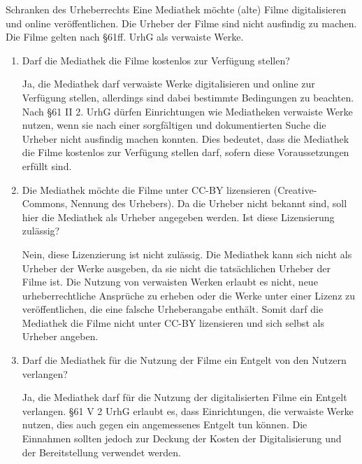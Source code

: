 \documentclass{article}
\begin{document}
\begin{exercise}{Schranken des Urheberrechts}
  Eine Mediathek möchte (alte) Filme digitalisieren und online veröffentlichen. Die Urheber der Filme sind nicht ausfindig zu machen. Die Filme gelten nach §61ff. UrhG als verwaiste Werke.
  \begin{enumerate}
    \item Darf die Mediathek die Filme kostenlos zur Verfügung stellen?

          \begin{solution}
            Ja, die Mediathek darf verwaiste Werke digitalisieren und online zur Verfügung stellen, allerdings sind dabei bestimmte Bedingungen zu beachten. Nach §61 II 2. UrhG dürfen Einrichtungen wie Mediatheken verwaiste Werke nutzen, wenn sie nach einer sorgfältigen und dokumentierten Suche die Urheber nicht ausfindig machen konnten. Dies bedeutet, dass die Mediathek die Filme kostenlos zur Verfügung stellen darf, sofern diese Voraussetzungen erfüllt sind.
          \end{solution}

    \item Die Mediathek möchte die Filme unter CC-BY lizensieren (Creative-Commons, Nennung des Urhebers). Da die Urheber nicht bekannt sind, soll hier die Mediathek als Urheber angegeben werden. Ist diese Lizensierung zulässig?

          \begin{solution}
            Nein, diese Lizenzierung ist nicht zulässig. Die Mediathek kann sich nicht als Urheber der Werke ausgeben, da sie nicht die tatsächlichen Urheber der Filme ist. Die Nutzung von verwaisten Werken erlaubt es nicht, neue urheberrechtliche Ansprüche zu erheben oder die Werke unter einer Lizenz zu veröffentlichen, die eine falsche Urheberangabe enthält. Somit darf die Mediathek die Filme nicht unter CC-BY lizensieren und sich selbst als Urheber angeben.
          \end{solution}

    \item Darf die Mediathek für die Nutzung der Filme ein Entgelt von den Nutzern verlangen?

          \begin{solution}
            Ja, die Mediathek darf für die Nutzung der digitalisierten Filme ein Entgelt verlangen. §61 V 2 UrhG erlaubt es, dass Einrichtungen, die verwaiste Werke nutzen, dies auch gegen ein angemessenes Entgelt tun können. Die Einnahmen sollten jedoch zur Deckung der Kosten der Digitalisierung und der Bereitstellung verwendet werden.
          \end{solution}


\end{enumerate}
\end{exercise}
\end{document}
